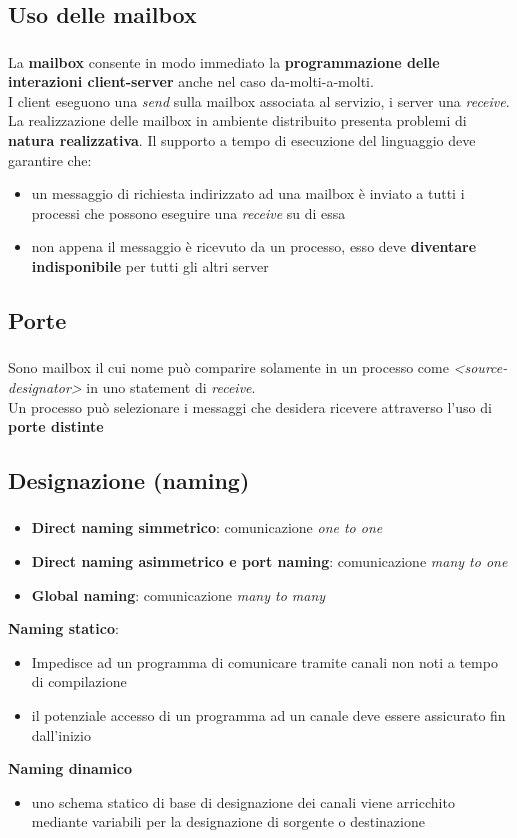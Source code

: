 \documentclass{beamer}
\newenvironment{mainframe}{
	\begin{frame}
		\frametitle{\insertsubsection}
		\framesubtitle{\insertsection}
	}{
	\end{frame}
}
\begin{document}
\subsection{Uso delle mailbox}
\begin{mainframe}
	La \textbf{mailbox} consente in modo immediato la \textbf{programmazione delle interazioni client-server} anche nel caso da-molti-a-molti.\\
	I client eseguono una \textit{send} sulla mailbox associata al servizio, i server una \textit{receive}.\\
	La realizzazione delle mailbox in ambiente distribuito presenta problemi di \textbf{natura realizzativa}. Il supporto a tempo di esecuzione del linguaggio deve garantire che:
	\begin{itemize}
		\item un messaggio di richiesta indirizzato ad una mailbox è inviato a tutti i processi che possono eseguire una \textit{receive} su di essa
		\item non appena il messaggio è ricevuto da un processo, esso deve \textbf{diventare indisponibile} per tutti gli altri server
	\end{itemize}
\end{mainframe}
\subsection{Porte}
\begin{mainframe}
	Sono mailbox il cui nome può comparire solamente in un processo come \textit{<source-designator>} in uno statement di \textit{receive}.\\
	Un processo può selezionare i messaggi che desidera ricevere attraverso l'uso di \textbf{porte distinte}
\end{mainframe}
\subsection{Designazione (naming)}
\begin{mainframe}
\begin{itemize}
	\item \textbf{Direct naming simmetrico}: comunicazione \textit{one to one}
	\item \textbf{Direct naming asimmetrico e port naming}: comunicazione \textit{many to one}
	\item \textbf{Global naming}: comunicazione \textit{many to many}
\end{itemize}
\textbf{Naming statico}:
\begin{itemize}
	\item Impedisce ad un programma di comunicare tramite canali non noti a tempo di compilazione
	\item il potenziale accesso di un programma ad un canale deve essere assicurato fin dall'inizio
\end{itemize}
\textbf{Naming dinamico}
\begin{itemize}
	\item uno schema statico di base di designazione dei canali viene arricchito mediante variabili per la designazione di sorgente o destinazione
\end{itemize}
\end{mainframe}
\end{document}
